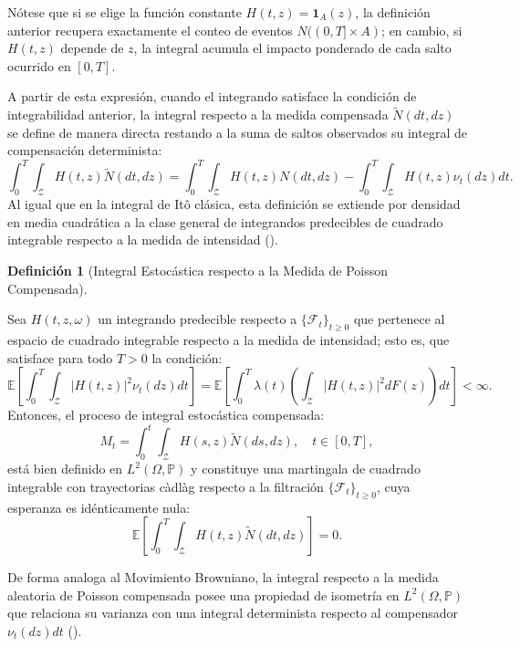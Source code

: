 \documentclass[
  spanish,
  us-letterpaper,
]{scrreprt}
\numberwithin{equation}{section}
\theoremstyle{plain}
\theoremstyle{plain}
\theoremstyle{plain}
\theoremstyle{definition}
\newtheorem{definition}{Definición}[chapter]
\theoremstyle{remark}
\begin{document}
Nótese que si se elige la función constante
\(H(t, z) = \mathbf{1}_A(z)\), la definición anterior recupera
exactamente el conteo de eventos \(N((0, T] \times A)\); en cambio, si
\(H(t, z)\) depende de \(z\), la integral acumula el impacto ponderado
de cada salto ocurrido en \([0, T]\).

A partir de esta expresión, cuando el integrando satisface la condición
de integrabilidad anterior, la integral respecto a la medida compensada
\(\tilde{N}(dt, dz)\) se define de manera directa restando a la suma de
saltos observados su integral de compensación determinista: \[
\int_0^T \int_{\mathcal{Z}} H(t, z) \tilde{N}(dt, dz) = \int_0^T \int_{\mathcal{Z}} H(t, z) N(dt, dz) - \int_0^T \int_{\mathcal{Z}} H(t, z) \nu_t(dz) dt.
\] Al igual que en la integral de Itô clásica, esta definición se
extiende por densidad en media cuadrática a la clase general de
integrandos predecibles de cuadrado integrable respecto a la medida de
intensidad ().

\begin{definition}[Integral Estocástica respecto a la Medida de Poisson
Compensada]\protect\hypertarget{def-integral-saltos}{}\label{def-integral-saltos}

Sea \(H(t, z, \omega)\) un integrando predecible respecto a
\(\{\mathcal{F}_t\}_{t \ge 0}\) que pertenece al espacio de cuadrado
integrable respecto a la medida de intensidad; esto es, que satisface
para todo \(T > 0\) la condición: \[
\mathbb{E} \left[ \int_0^T \int_{\mathcal{Z}} \vert H(t, z) \vert^2 \nu_t(dz) dt \right] = \mathbb{E} \left[ \int_0^T \lambda(t) \left( \int_{\mathcal{Z}} \vert H(t, z) \vert^2 dF(z) \right) dt \right] < \infty.
\] Entonces, el proceso de integral estocástica compensada: \[
M_t = \int_0^t \int_{\mathcal{Z}} H(s, z) \tilde{N}(ds, dz), \quad t \in [0, T],
\] está bien definido en \(L^2(\Omega, \mathbb{P})\) y constituye una
martingala de cuadrado integrable con trayectorias càdlàg respecto a la
filtración \(\{\mathcal{F}_t\}_{t \ge 0}\), cuya esperanza es
idénticamente nula: \[
\mathbb{E}\left[ \int_0^T \int_{\mathcal{Z}} H(t, z) \tilde{N}(dt, dz) \right] = 0.
\]

\end{definition}

De forma analoga al Movimiento Browniano, la integral respecto a la
medida aleatoria de Poisson compensada posee una propiedad de isometría
en \(L^2(\Omega, \mathbb{P})\) que relaciona su varianza con una
integral determinista respecto al compensador \(\nu_t(dz)dt\)
().
\end{document}
